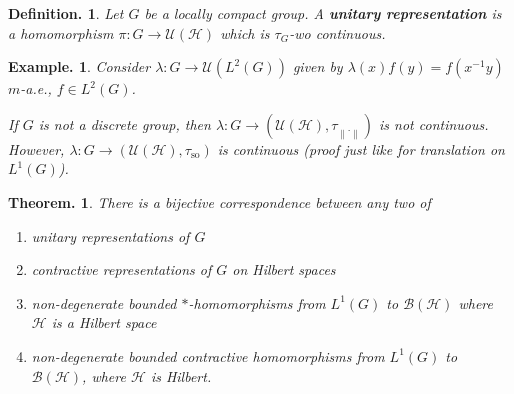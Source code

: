 \documentclass[11pt, a4paper]{memoir}
\newcommand{\norm}[1]{\ensuremath{\left\lVert#1\right\rVert}}
\theoremstyle{change}
\newtheorem{theorem}{Theorem.}[section]
\theoremstyle{plain}
\theoremstyle{nonumberplain}
\newtheorem{definition}{Definition.}
\newtheorem{example}{Example.}
\newcommand{\defn}[1]{{\boldmath\bfseries #1}}
\numberwithin{equation}{section}
\begin{document}
\begin{definition}
    Let $G$ be a locally compact group.
    A \defn{unitary representation} is a homomorphism $\pi:G\to\mathcal{U}(\mathcal{H})$ which is $\tau_G$-wo continuous.
\end{definition}
\begin{example}
    Consider $\lambda:G\to\mathcal{U}(L^2(G))$ given by $\lambda(x)f(y)=f(x^{-1}y)$ $m$-a.e., $f\in L^2(G)$.

    If $G$ is not a discrete group, then $\lambda:G\to(\mathcal{U}(\mathcal{H}),\tau_{\norm{\cdot}})$ is not continuous.
    However, $\lambda:G\to(\mathcal{U}(\mathcal{H}),\tau_{\mathrm{so}})$ is continuous (proof just like for translation on $L^1(G)$).
\end{example}
\begin{theorem}
    There is a bijective correspondence between any two of
    \begin{enumerate}[nl,r]
        \item unitary representations of $G$
        \item contractive representations of $G$ on Hilbert spaces
        \item non-degenerate bounded $*$-homomorphisms from $L^1(G)$ to $\mathcal{B}(\mathcal{H})$ where $\mathcal{H}$ is a Hilbert space
        \item non-degenerate bounded contractive homomorphisms from $L^1(G)$ to $\mathcal{B}(\mathcal{H})$, where $\mathcal{H}$ is Hilbert.
    \end{enumerate}
\end{theorem}
\end{document}
